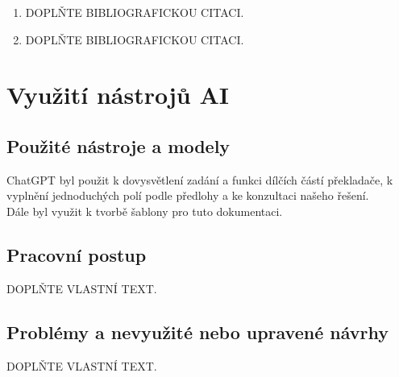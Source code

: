 \documentclass[10pt,a4paper]{article}
\begin{document}
\begin{enumerate}
    \item DOPLŇTE BIBLIOGRAFICKOU CITACI.
    \item DOPLŇTE BIBLIOGRAFICKOU CITACI.
\end{enumerate}

\section{Využití nástrojů AI}

\subsection{Použité nástroje a modely}
ChatGPT byl použit k dovysvětlení zadání a funkci dílčích částí překladače, k vyplnění jednoduchých polí podle předlohy a ke konzultaci našeho řešení. \\
Dále byl využit k tvorbě šablony pro tuto dokumentaci.

\subsection{Pracovní postup}
DOPLŇTE VLASTNÍ TEXT.

\subsection{Problémy a nevyužité nebo upravené návrhy}
DOPLŇTE VLASTNÍ TEXT.
\end{document}
